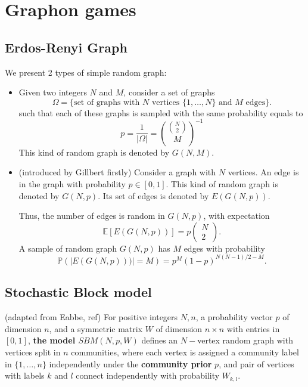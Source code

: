 \section{Graphon games}

\subsection{Erdos-Renyi Graph}
We present 2 types of simple random graph:
\begin{itemize}
	\item	Given two integers $N$ and $M$, consider a set of graphs
	$$
		\Omega = \{ \text{set of graphs with } N \text{ vertices } \{1,\ldots,N\} \text{ and } M \text{ edges}  \}.
	$$ 
	such that each of these graphs is sampled with the same probability equals to 
	$$
		p = \frac{1}{\vert \Omega \vert} = \binom{\binom{N}{2}}{M}^{-1}
	$$
	This kind of random graph is denoted by $G(N,M)$.
	
	\item (introduced by Gillbert firstly) Consider a graph with $N$ vertices. An edge is in the graph with probability $p \in [0,1]$. This kind of random graph is denoted by $G(N,p)$. Its set of edges is denoted by $E(G(N,p))$.
	
	Thus, the number of edges is random in $G(N,p)$, with expectation 
	$$\mathbb{E}[ E(G(N,p))] = p \left( \begin{array}{c} N \\ 2 \end{array} \right).$$
	A sample of random graph $G(N,p)$ has $M$ edges with probability
	$$
		\mathbb{P}( |E(G(N,p)))| = M ) = p^M (1-p)^{N (N-1)/ 2 - M}.
	$$
\end{itemize}

\subsection{Stochastic Block model}


\begin{definition}(adapted from Eabbe, ref)
	For positive integers $N,n$, a probability vector $p$ of dimension $n$, and a symmetric matrix $W$ of dimension $n \times n$ with entries in $[0,1]$, \textbf{ the model $SBM(N,p,W)$} defines an $N-$vertex random graph with vertices split in $n$ communities, where each vertex is assigned a community label in $\{1,\ldots,n\}$ independently under the \textbf{community prior} $p$, and pair of vertices with labels $k$ and $l$ connect independently with probability $W_{k,l}$.	
\end{definition}

